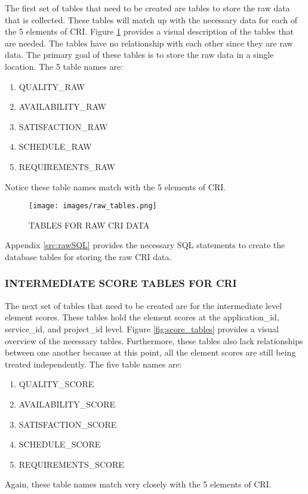 \documentclass[SDSUThesis.tex]{subfiles}
\begin{document}
            The first set of tables that need to be created are tables
            to store the raw data that is collected.  These tables
            will match up with the necessary data for each of the 5 elements
            of CRI.  Figure \ref{fig:raw} provides a visual description
            of the tables that are needed.  The tables have no relationship
            with each other since they are raw data.  The primary goal of
            these tables is to store the raw data in a single location. The
            5 table names are:
            \begin{enumerate}
                \item QUALITY\_RAW
                \item AVAILABILITY\_RAW
                \item SATISFACTION\_RAW
                \item SCHEDULE\_RAW
                \item REQUIREMENTS\_RAW
            \end{enumerate}
            Notice these table names match with the 5 elements of CRI.
        
           \begin{figure}[htb]
                \centering
                \texttt{[image: images/raw\_tables.png]}
                \caption{TABLES FOR RAW CRI DATA}
                \label{fig:raw}
            \end{figure}
            
            Appendix \ref{src:rawSQL} provides the necessary SQL statements to create the 
            database tables for storing the raw CRI data.  
            
        \subsubsection{INTERMEDIATE SCORE TABLES FOR CRI}
            The next set of tables that need to be created are for the 
            intermediate level element scores.  These tables hold the
            element scores at the application\_id, service\_id, and project\_id
            level.  Figure \ref{fig:score_tables} provides a visual overview
            of the necessary tables.  Furthermore, these tables also lack
            relationships between one another because at this point, all the
            element scores are still being treated independently.  The five
            table names are:
            
            \begin{enumerate}
                \item QUALITY\_SCORE
                \item AVAILABILITY\_SCORE
                \item SATISFACTION\_SCORE
                \item SCHEDULE\_SCORE
                \item REQUIREMENTS\_SCORE
            \end{enumerate}
            Again, these table names match very closely with the 5 elements of CRI.
        
\end{document}
